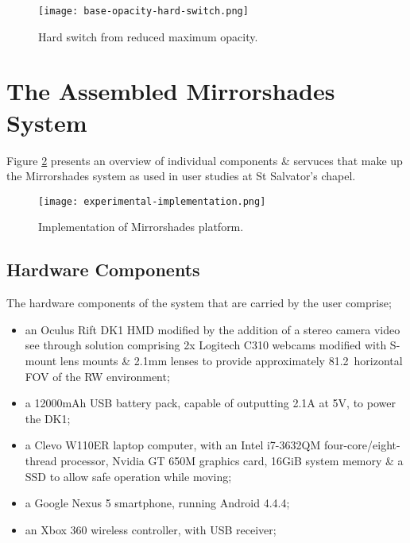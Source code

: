 \begin{figure}[h]
	\begin{center}
		\texttt{[image: base-opacity-hard-switch.png]}
		\caption{Hard switch from reduced maximum opacity.}
		\label{scenariobaseopacity}
	\end{center}
\end{figure}


\section{The Assembled Mirrorshades System}

Figure \ref{experimentalimplementation} presents an overview of individual components \& servuces that make up the Mirrorshades system as used in user studies at St Salvator's chapel.

\begin{figure}[h]
	\thispagestyle{empty}
	\begin{center}
		\texttt{[image: experimental-implementation.png]}
		\caption{Implementation of Mirrorshades platform.}
		\label{experimentalimplementation}
	\end{center}
\end{figure}

\subsection{Hardware Components}
The hardware components of the system that are carried by the user comprise;
\begin{itemize}
	\item an Oculus Rift DK1 HMD modified by the addition of a stereo camera video see through solution comprising 2x Logitech C310 webcams modified with S-mount lens mounts \& 2.1mm lenses to provide approximately 81.2\textdegree\ horizontal FOV of the RW environment;
	\item a 12000mAh USB battery pack, capable of outputting 2.1A at 5V, to power the DK1;
	\item a Clevo W110ER laptop computer, with an Intel i7-3632QM four-core/eight-thread processor, Nvidia GT 650M graphics card, 16GiB system memory \& a SSD to allow safe operation while moving;
	\item a Google Nexus 5 smartphone, running Android 4.4.4;
	\item an Xbox 360 wireless controller, with USB receiver;
\end{itemize}

